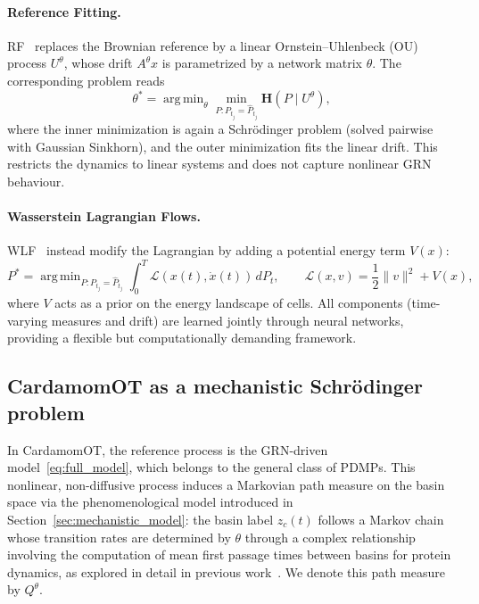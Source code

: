 \documentclass[a4paper, 11pt]{article}
\DeclareMathOperator*{\argmin}{arg\,min}
\theoremstyle{plain}
\theoremstyle{remark}
\newcommand*{\firstreview}[1]{{\color{black}#1}}
\begin{document}
\begin{appendices}
\paragraph{Reference Fitting.}
\firstreview{RF}~\cite{zhang2024joint} replaces the Brownian reference by a linear Ornstein–Uhlenbeck (OU) process $U^\theta$, whose drift $A^\theta x$ is parametrized by a network matrix $\theta$. The corresponding problem reads
\begin{equation}
\label{eq:RF}
\theta^* = \argmin_\theta
\min_{P: P_{t_j} = \hat{P}_{t_j}}
\mathbf{H}(P \mid U^\theta),
\end{equation}
where the inner minimization is again a Schrödinger problem (solved pairwise with Gaussian Sinkhorn), and the outer minimization fits the linear drift. This restricts the dynamics to linear systems and does not capture nonlinear GRN behaviour.

\paragraph{Wasserstein Lagrangian Flows.}
\firstreview{WLF}~\cite{neklyudov2023computational} instead modify the Lagrangian by adding a potential energy term $V(x)$:
\begin{equation}
\label{eq:WLF}
P^* = \argmin_{P: P_{t_j} = \hat{P}_{t_j}}
\int_0^T \mathcal{L}(x(t), \dot{x}(t))\,dP_t,
\qquad
\mathcal{L}(x,v) = \frac{1}{2}\|v\|^2 + V(x),
\end{equation}
where $V$ acts as a prior on the energy landscape of cells. All components (time-varying measures and drift) are learned jointly through neural networks, providing a flexible but computationally demanding framework.

\subsection{CardamomOT as a mechanistic Schrödinger problem}

In CardamomOT, the reference process is the GRN-driven model~\eqref{eq:full_model}, which belongs to the general class of PDMPs. This nonlinear, non-diffusive process induces a Markovian path measure on the basin space via the phenomenological model introduced in Section~\ref{sec:mechanistic_model}: the basin label $z_c(t)$ follows a Markov chain whose transition rates are determined by $\theta$ through a complex relationship involving the computation of mean first passage times between basins for protein dynamics, as explored in detail in previous work~\cite{ventre2020reduction}. We denote this path measure by $Q^\theta$.


\end{appendices}
\end{document}
